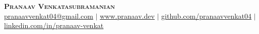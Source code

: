 \begin{center}
    \textbf{\Huge \scshape Pranaav Venkatasubramanian}\\ \vspace{1pt}
    \href{mailto:pranaavvenkat04@gmail.com}{pranaavvenkat04@gmail.com} \hspace{-3pt}
    $|$ \hspace{-3pt}
    \href{https://www.pranaav.dev}{\underline{www.pranaav.dev}} \hspace{-3pt}
    $|$ \hspace{-3pt}
    \href{https://github.com/pranaavvenkat04}{\underline{github.com/pranaavvenkat04}}\hspace{-3pt}
    $|$ \href{https://www.linkedin.com/in/pranaav-venkat}{\underline{linkedin.com/in/pranaav-venkat}}
\end{center}
